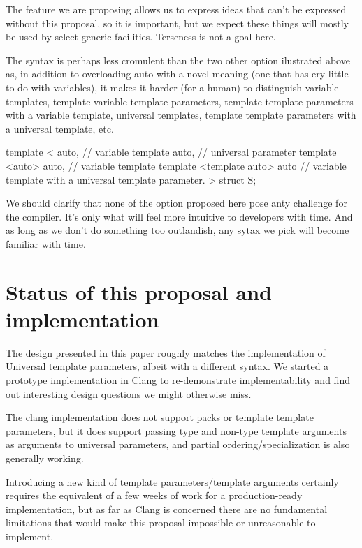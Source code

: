 \documentclass{wg21}
\begin{document}
The feature we are proposing allows us to express ideas that can't be expressed without this proposal, so it is important,
but we expect these things will mostly be used by select generic facilities. Terseness is not a goal here.

The  syntax is perhaps less cromulent than the two other option ilustrated above as, in addition to overloading
auto with a novel meaning (one that has ery little to do with variables), it makes it harder (for a human) to distinguish
variable templates, template variable template parameters, template template parameters with a variable template, universal templates,
template template parameters with a universal template, etc.

\begin{colorblock}
template <
   auto, // variable
   template auto, // universal parameter
   template <auto> auto, // variable template
   template <template auto> auto // variable template with a universal template parameter.
>
struct S;
\end{colorblock}


We should clarify that none of the option proposed here pose anty challenge for the compiler. It's only what will feel more intuitive to
developers with time. And as long as we don't do something too outlandish, any sytax we pick will become familiar with time.


\section{Status of this proposal and implementation}

The design presented in this paper roughly matches the implementation of Universal template parameters, albeit with a different syntax.
We started a prototype implementation in Clang to re-demonstrate implementability and find out interesting design questions we might otherwise
miss.

The clang implementation does not support packs or template template parameters, but it does support passing type and non-type template arguments
as arguments to universal parameters, and partial ordering/specialization is also generally working.

Introducing a new kind of template parameters/template arguments certainly requires the equivalent of a few weeks of work for a production-ready implementation,
but as far as Clang is concerned there are no fundamental limitations that would make this proposal impossible or unreasonable to implement.
\end{document}
